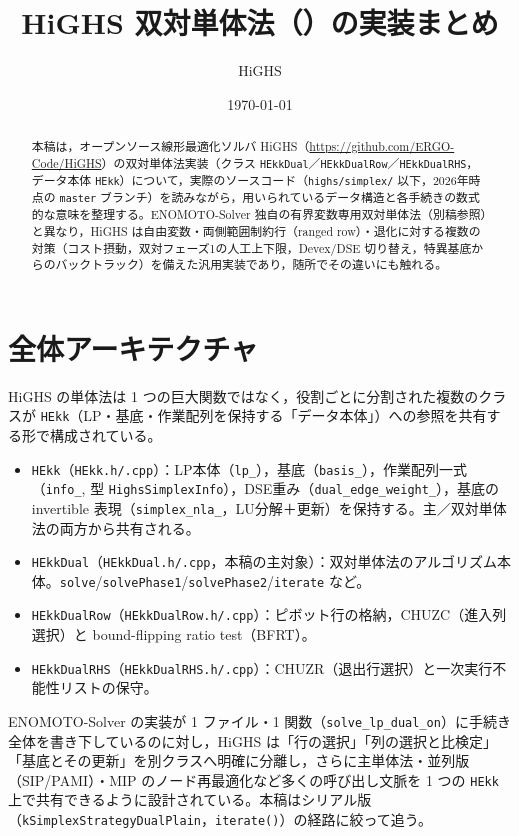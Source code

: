 \documentclass[11pt,a4paper]{ltjsarticle}
\title{HiGHS 双対単体法（\code{HEkkDual}）の実装まとめ}
\author{HiGHS \code{ERGO-Code/HiGHS} \quad \code{highs/simplex/HEkkDual*.\{h,cpp\}}}
\date{\today}
\newcommand{\code}[1]{\texttt{#1}}
\begin{document}
\maketitle

\begin{abstract}
本稿は，オープンソース線形最適化ソルバ HiGHS（\url{https://github.com/ERGO-Code/HiGHS}）の双対単体法実装（クラス \code{HEkkDual}／\code{HEkkDualRow}／\code{HEkkDualRHS}，データ本体 \code{HEkk}）について，実際のソースコード（\code{highs/simplex/} 以下，2026年時点の \code{master} ブランチ）を読みながら，用いられているデータ構造と各手続きの数式的な意味を整理する。ENOMOTO-Solver 独自の有界変数専用双対単体法（別稿参照）と異なり，HiGHS は自由変数・両側範囲制約行（ranged row）・退化に対する複数の対策（コスト摂動，双対フェーズ1の人工上下限，Devex/DSE 切り替え，特異基底からのバックトラック）を備えた汎用実装であり，随所でその違いにも触れる。
\end{abstract}

\tableofcontents

\section{全体アーキテクチャ}

HiGHS の単体法は 1 つの巨大関数ではなく，役割ごとに分割された複数のクラスが \code{HEkk}（LP・基底・作業配列を保持する「データ本体」）への参照を共有する形で構成されている。

\begin{itemize}
  \item \code{HEkk}（\code{HEkk.h/.cpp}）：LP本体（\code{lp\_}），基底（\code{basis\_}），作業配列一式（\code{info\_}, 型 \code{HighsSimplexInfo}），DSE重み（\code{dual\_edge\_weight\_}），基底の invertible 表現（\code{simplex\_nla\_}，LU分解＋更新）を保持する。主／双対単体法の両方から共有される。
  \item \code{HEkkDual}（\code{HEkkDual.h/.cpp}，本稿の主対象）：双対単体法のアルゴリズム本体。\code{solve}/\code{solvePhase1}/\code{solvePhase2}/\code{iterate} など。
  \item \code{HEkkDualRow}（\code{HEkkDualRow.h/.cpp}）：ピボット行の格納，CHUZC（進入列選択）と bound-flipping ratio test（BFRT）。
  \item \code{HEkkDualRHS}（\code{HEkkDualRHS.h/.cpp}）：CHUZR（退出行選択）と一次実行不能性リストの保守。
\end{itemize}

ENOMOTO-Solver の実装が 1 ファイル・1 関数（\code{solve\_lp\_dual\_on}）に手続き全体を書き下しているのに対し，HiGHS は「行の選択」「列の選択と比検定」「基底とその更新」を別クラスへ明確に分離し，さらに主単体法・並列版（SIP/PAMI）・MIP のノード再最適化など多くの呼び出し文脈を 1 つの \code{HEkk} 上で共有できるように設計されている。本稿はシリアル版（\code{kSimplexStrategyDualPlain}，\code{iterate()}）の経路に絞って追う。
\end{document}
